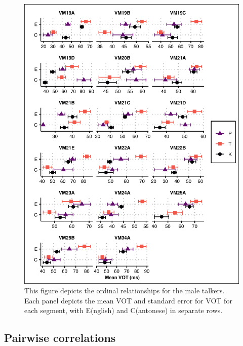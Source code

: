 \begin{figure}[htbp]
  \begin{center}
  \includegraphics[width=0.9\linewidth]{figures/ch4_ordrel_vm_5in.png} 
  \caption{This figure depicts the ordinal relationships for the male talkers. Each panel depicts the mean VOT and standard error for VOT for each segment, with E(nglish) and C(antonese) in separate rows.}
  \label{ch4:fig:ordrelvm}
  \end{center}
\end{figure}

\subsection{Pairwise correlations}\label{ch4:sec:correlations}

